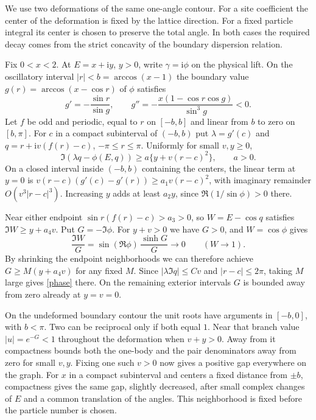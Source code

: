 \documentclass[11pt]{article}
\newcommand{\ii}{\mathrm i}
\begin{document}
We use two deformations of the same one-angle contour. For a site
coefficient the center of the deformation is fixed by the lattice
direction. For a fixed particle integral its center is chosen to
preserve the total angle. In both cases the required decay comes from
the strict concavity of the boundary dispersion relation.

Fix $0<x<2$. At $E=x+\ii y$, $y>0$, write $\gamma=\ii\phi$ on
the physical lift. On the oscillatory interval $|r|<b=\arccos(x-1)$
the boundary value $g(r)=\arccos(x-\cos r)$ of $\phi$ satisfies
\[
 g'=-\frac{\sin r}{\sin g},\qquad
 g''=-\frac{x(1-\cos r\cos g)}{\sin^3g}<0 .
\]
Let $f$ be odd and periodic, equal to $r$ on $[-b,b]$ and linear
from $b$ to zero on $[b,\pi]$. For $c$ in a compact subinterval of
$(-b,b)$ put $\lambda=g'(c)$ and $q=r+\ii v(f(r)-c)$,
$-\pi\le r\le\pi$. Uniformly for small $v,y\ge0$,
\begin{equation}\label{phase}
 \Im(\lambda q-\phi(E,q))\ge a\{y+v(r-c)^2\},\qquad a>0 .
\end{equation}
On a closed interval inside $(-b,b)$ containing the centers, the
linear term at $y=0$ is
$v(r-c)(g'(c)-g'(r))\ge a_1v(r-c)^2$, with imaginary remainder
$O(v^3|r-c|^3)$. Increasing $y$ adds at least $a_2y$, since
$\Re(1/\sin\phi)>0$ there.

Near either endpoint $\sin r(f(r)-c)>a_3>0$, so
$W=E-\cos q$ satisfies $\Im W\ge y+a_4v$. Put $G=-\Im\phi$.
For $y+v>0$ we have $G>0$, and $W=\cos\phi$ gives
\[
 \frac{\Im W}{G}=\sin(\Re\phi)\,\frac{\sinh G}{G}\longrightarrow 0
 \qquad(W\longrightarrow1).
\]
By shrinking the endpoint neighborhoods we can therefore achieve
$G\ge M(y+a_4v)$ for any fixed $M$. Since $|\lambda\Im q|\le C v$
and $|r-c|\le2\pi$, taking $M$ large gives \eqref{phase} there.
On the remaining exterior intervals $G$ is bounded away from zero
already at $y=v=0$.

On the undeformed boundary contour the unit roots have arguments in
$[-b,0]$, with $b<\pi$. Two can be reciprocal only if both equal $1$.
Near that branch value $|u|=e^{-G}<1$ throughout the deformation
when $v+y>0$. Away from it compactness bounds both the one-body
and the pair denominators away from zero for small $v,y$. Fixing
one such $v>0$ now gives a positive gap everywhere on the graph.
For $x$ in a compact subinterval and centers a fixed distance from
$\pm b$, compactness gives the same gap, slightly decreased, after
small complex changes of $E$ and a common translation of the angles.
This neighborhood is fixed before the particle number is chosen.
\end{document}
